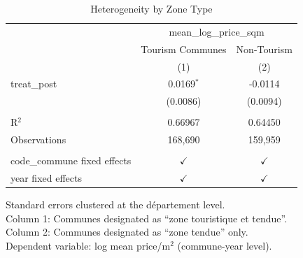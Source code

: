 
\begin{table}[htbp]
   \caption{\label{tab:heterogeneity} Heterogeneity by Zone Type}
   \bigskip
   \centering
   \begin{tabular}{lcc}
      \toprule
       & \multicolumn{2}{c}{mean\_log\_price\_sqm}\\
                                   & Tourism Communes & Non-Tourism \\   
                                   & (1)              & (2)\\  
      \midrule 
      treat\_post                  & 0.0169$^{*}$     & -0.0114\\   
                                   & (0.0086)         & (0.0094)\\   
       \\
      R$^2$                        & 0.66967          & 0.64450\\  
      Observations                 & 168,690          & 159,959\\  
       \\
      code\_commune fixed effects  & $\checkmark$     & $\checkmark$\\   
      year fixed effects           & $\checkmark$     & $\checkmark$\\   
      \bottomrule
   \end{tabular}
   
   \par \raggedright 
   Standard errors clustered at the d\'epartement level.\\
   Column 1: Communes designated as ``zone touristique et tendue''.\\
   Column 2: Communes designated as ``zone tendue'' only.\\
   Dependent variable: log mean price/m$^2$ (commune-year level).
\end{table}


